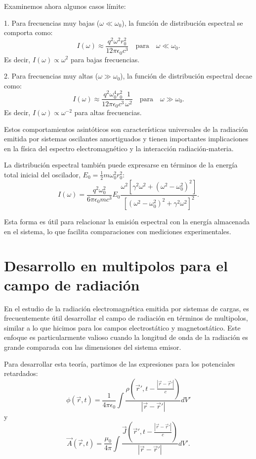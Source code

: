 \documentclass[12pt,a4paper]{book}
\begin{document}
Examinemos ahora algunos casos límite:

1. Para frecuencias muy bajas ($\omega \ll \omega_0$), la función de distribución espectral se comporta como:
\begin{equation}
I(\omega) \approx \frac{q^2\omega^2r_0^2}{12\pi\epsilon_0c^3} \quad \text{para} \quad \omega \ll \omega_0.
\end{equation}
Es decir, $I(\omega) \propto \omega^2$ para bajas frecuencias.

2. Para frecuencias muy altas ($\omega \gg \omega_0$), la función de distribución espectral decae como:
\begin{equation}
I(\omega) \approx \frac{q^2\omega_0^4r_0^2}{12\pi\epsilon_0c^3}\frac{1}{\omega^2} \quad \text{para} \quad \omega \gg \omega_0.
\end{equation}
Es decir, $I(\omega) \propto \omega^{-2}$ para altas frecuencias.

Estos comportamientos asintóticos son características universales de la radiación emitida por sistemas oscilantes amortiguados y tienen importantes implicaciones en la física del espectro electromagnético y la interacción radiación-materia.

La distribución espectral también puede expresarse en términos de la energía total inicial del oscilador, $E_0 = \frac{1}{2}m\omega_0^2r_0^2$:
\begin{equation}
I(\omega) = \frac{q^2\omega_0^2}{6\pi\epsilon_0mc^3}E_0\frac{\omega^2[\gamma^2\omega^2 + (\omega^2 - \omega_0^2)^2]}{[(\omega^2 - \omega_0^2)^2 + \gamma^2\omega^2]^2}.
\end{equation}

Esta forma es útil para relacionar la emisión espectral con la energía almacenada en el sistema, lo que facilita comparaciones con mediciones experimentales.

\section{Desarrollo en multipolos para el campo de radiación}

En el estudio de la radiación electromagnética emitida por sistemas de cargas, es frecuentemente útil desarrollar el campo de radiación en términos de multipolos, similar a lo que hicimos para los campos electrostático y magnetostático. Este enfoque es particularmente valioso cuando la longitud de onda de la radiación es grande comparada con las dimensiones del sistema emisor.

Para desarrollar esta teoría, partimos de las expresiones para los potenciales retardados:
\begin{equation}
\phi(\vec{r}, t) = \frac{1}{4\pi\epsilon_0}\int\frac{\rho(\vec{r}', t-\frac{|\vec{r}-\vec{r}'|}{c})}{|\vec{r}-\vec{r}'|}dV'
\end{equation}
y
\begin{equation}
\vec{A}(\vec{r}, t) = \frac{\mu_0}{4\pi}\int\frac{\vec{J}(\vec{r}', t-\frac{|\vec{r}-\vec{r}'|}{c})}{|\vec{r}-\vec{r}'|}dV'.
\end{equation}
\end{document}
